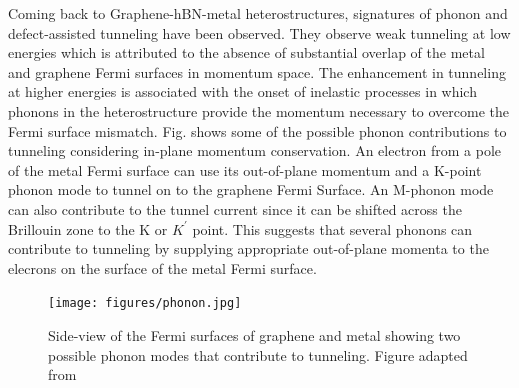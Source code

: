 Coming back to Graphene-hBN-metal heterostructures, signatures of phonon and defect-assisted tunneling have been observed. \cite{Chandni} They observe weak tunneling at low energies which is attributed to the absence of substantial overlap of the metal and graphene Fermi surfaces in momentum space. The enhancement in tunneling at higher energies is associated with the onset of inelastic processes in which phonons in the heterostructure provide the momentum necessary to overcome the Fermi surface mismatch. Fig. shows some of the possible phonon contributions to tunneling considering in-plane momentum conservation. An electron from a pole of the metal Fermi surface can use its out-of-plane momentum and a K-point phonon mode to tunnel on to the graphene Fermi Surface. An M-phonon mode can also contribute to the tunnel current since it can be shifted across the Brillouin zone to the K or $K^\prime$ point. This suggests that several phonons can contribute to tunneling by supplying appropriate out-of-plane momenta to the elecrons on the surface of the metal Fermi surface.

\begin{figure}[H]
	\centering
	\texttt{[image: figures/phonon.jpg]}
	\caption{Side-view of the Fermi surfaces of graphene and metal showing two possible phonon modes that contribute
		to tunneling. Figure adapted from \cite{Chandni}}
	\label{fig:phonon}
\end{figure}